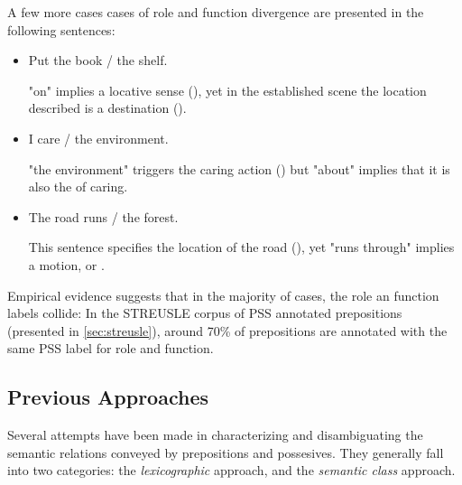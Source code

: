 A few more cases cases of role and function divergence are presented in the following sentences:

\begin{itemize}
    \item Put the book / the shelf.
          
          "on" implies a locative sense (), yet in the established scene the location described is a destination ().
    \item I care / the environment.
          
          "the environment" triggers the caring action () but "about" implies that it is also the  of caring.
    \item The road runs / the forest.
          
          This sentence specifies the location of the road (), yet "runs through" implies a motion, or .
\end{itemize}

Empirical evidence suggests that in the majority of cases, the role an function labels collide: In the STREUSLE corpus of PSS annotated prepositions (presented in \ref{sec:streusle}), around 70\% of prepositions are annotated with the same PSS label for role and function. 

\subsection{Previous Approaches}

Several attempts have been made in characterizing and disambiguating the semantic relations conveyed by prepositions and possesives. They generally fall into two categories: the \textit{lexicographic} approach, and the \textit{semantic class} approach. 

